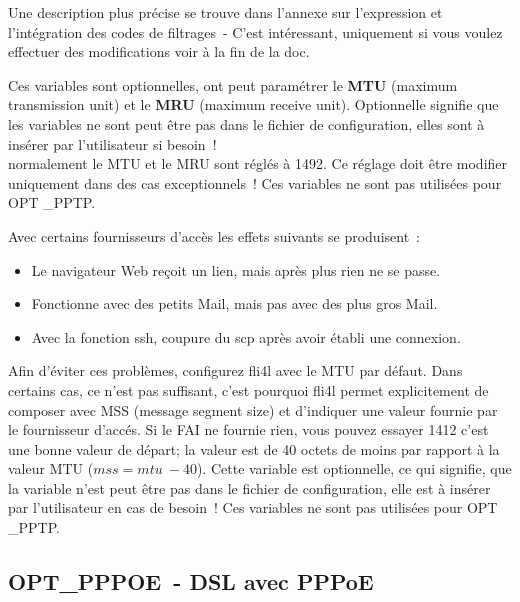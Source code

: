 \begin{description}
Une description plus précise se trouve dans l'annexe sur l'expression et
l'intégration des codes de filtrages~- C'est intéressant, uniquement si
vous voulez effectuer des modifications voir à la fin de la doc.


  Ces variables sont optionnelles, ont peut paramétrer le \textbf{MTU}
  (maximum transmission unit) et le \textbf{MRU} (maximum receive unit).
  Optionnelle signifie que les variables ne sont peut être pas dans le
  fichier de configuration, elles sont à insérer par l'utilisateur si besoin~! \\
  normalement le MTU et le MRU sont réglés à 1492. Ce réglage doit être
  modifier uniquement dans des cas exceptionnels~! Ces variables ne sont pas
  utilisées pour OPT \_PPTP.


 Avec certains fournisseurs d'accès les effets suivants se produisent~:
  \begin{itemize}
  \item Le navigateur Web reçoit un lien, mais après plus rien ne se passe.
  \item Fonctionne avec des petits Mail, mais pas avec des plus gros Mail.
  \item Avec la fonction ssh, coupure du scp après avoir établi une connexion.
  \end{itemize}

  Afin d'éviter ces problèmes, configurez fli4l avec le MTU par défaut.
  Dans certains cas, ce n'est pas suffisant, c'est pourquoi fli4l permet
  explicitement de composer avec MSS (message segment size) et d'indiquer
  une valeur fournie par le fournisseur d'accés. Si le FAI ne fournie rien,
  vous pouvez essayer 1412 c'est une bonne valeur de départ; la valeur est
  de 40 octets de moins par rapport à la valeur MTU ($mss = mtu~- 40$). Cette
  variable est optionnelle, ce qui signifie, que la variable n'est peut être
  pas dans le fichier de configuration, elle est à insérer par l'utilisateur
  en cas de besoin~! Ces variables ne sont pas utilisées pour OPT \_PPTP.

\end{description}
{
\subsection {OPT\_PPPOE~- DSL avec PPPoE}
}


